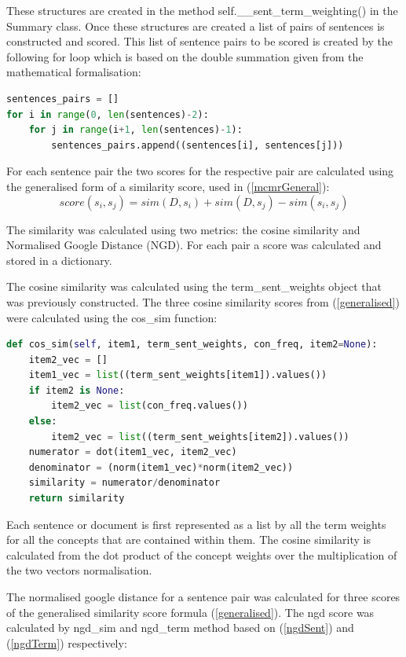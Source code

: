 These structures are created in the method self.\_\_sent\_term\_weighting() in the Summary class. Once these structures are created a list of pairs of sentences is constructed and scored. This list of sentence pairs to be scored is created by the following for loop which is based on the double summation given from the mathematical formalisation:

\begin{lstlisting}[language=Python]
sentences_pairs = []
for i in range(0, len(sentences)-2):
    for j in range(i+1, len(sentences)-1):
        sentences_pairs.append((sentences[i], sentences[j]))
\end{lstlisting}

For each sentence pair the two scores for the respective pair are calculated using the generalised form of a similarity score, used in (\ref{mcmrGeneral}):
\begin{equation}
    score(s_i,s_j) = sim(D,s_i) + sim(D,s_j) - sim(s_i,s_j)
    \label{generalised}
\end{equation}

The similarity was calculated using two metrics: the cosine similarity and Normalised Google Distance (NGD). For each pair a score was calculated and stored in a dictionary.

The cosine similarity was calculated using the term\_sent\_weights object that was previously constructed. The three cosine similarity scores from (\ref{generalised}) were calculated using the cos\_sim function:

\begin{lstlisting}[language=Python]
def cos_sim(self, item1, term_sent_weights, con_freq, item2=None):
    item2_vec = []
    item1_vec = list((term_sent_weights[item1]).values())
    if item2 is None:
        item2_vec = list(con_freq.values())
    else:
        item2_vec = list((term_sent_weights[item2]).values())
    numerator = dot(item1_vec, item2_vec)
    denominator = (norm(item1_vec)*norm(item2_vec))
    similarity = numerator/denominator
    return similarity
\end{lstlisting}

Each sentence or document is first represented as a list by all the term weights for all the concepts that are contained within them. The cosine similarity is calculated from the dot product of the concept weights over the multiplication of the two vectors normalisation.

The normalised google distance for a sentence pair was calculated for three scores of the generalised similarity score formula (\ref{generalised}). The ngd score was calculated by ngd\_sim and ngd\_term method based on (\ref{ngdSent}) and (\ref{ngdTerm}) respectively:

